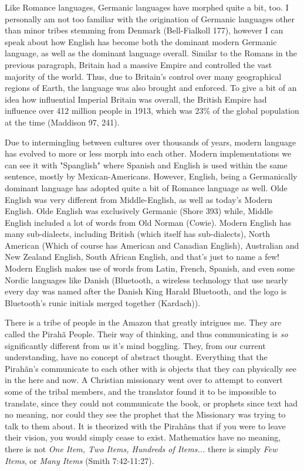 \documentclass[12pt]{article}
\begin{document}
\par
Like Romance languages, Germanic languages have morphed quite a bit, too. I personally am not too familiar with the origination of Germanic languages other than minor tribes stemming from Denmark (Bell-Fialkoll 177), however I can speak about how English has become both the dominant modern Germanic language, as well as the dominant language overall. Similar to the Romans in the previous paragraph, Britain had a massive Empire and controlled the vast majority of the world. Thus, due to Britain's control over many geographical regions of Earth, the language was also brought and enforced. To give a bit of an idea how influential Imperial Britain was overall, the British Empire had influence over 412 million people in 1913, which was 23\% of the global population at the time (Maddison 97, 241).
\par
Due to intermingling between cultures over thousands of years, modern language has evolved to more or less morph into each other. Modern implementations we can see it with "Spanglish" where Spanish and English is used within the same sentence, mostly by Mexican-Americans. However, English, being a Germanically dominant language has adopted quite a bit of Romance language as well. Olde English was very different from Middle-English, as well as today's Modern English. Olde English was exclusively Germanic (Shore 393) while, Middle English included a lot of words from Old Norman (Cowie). Modern English has many sub-dialects, including British (which itself has sub-dialects), North American (Which of course has American and Canadian English), Australian and New Zealand English, South African English, and that's just to name a few! Modern English makes use of words from Latin, French, Spanish, and even some Nordic languages like Danish (Bluetooth, a wireless technology that use nearly every day was named after the Danish King Harald Bluetooth, and the logo is Bluetooth's runic initials merged together (Kardach)).
\par
There is a tribe of people in the Amazon that greatly intrigues me. They are called the Pirah\~{a} People. Their way of thinking, and thus communicating is \emph{so} significantly different from us it's mind boggling. They, from our current understanding, have no concept of abstract thought. Everything that the Pirah\~{a}n's communicate to each other with is objects that they can physically see in the here and now. A Christian missionary went over to attempt to convert some of the tribal members, and the translator found it to be impossible to translate, since they could not communicate the book, or prophets since text had no meaning, nor could they see the prophet that the Missionary was trying to talk to them about. It is theorized with the Pirah\~{a}ns that if you were to leave their vision, you would simply cease to exist. Mathematics have no meaning, there is not \emph{One Item, Two Items, Hundreds of Items...} there is simply \emph{Few Items}, or \emph{Many Items} (Smith 7:42-11:27).
\par
\end{document}
